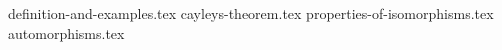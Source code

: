 \setcounter{chapter}{6}
\setcounter{section}{0}
{definition-and-examples.tex}
{cayleys-theorem.tex}
{properties-of-isomorphisms.tex}
{automorphisms.tex}
